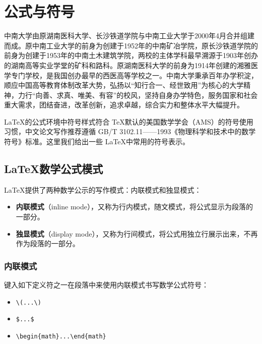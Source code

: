 \chapter{公式与符号}

中南大学由原湖南医科大学、长沙铁道学院与中南工业大学于2000年4月合并组建而成。原中南工业大学的前身为创建于1952年的中南矿冶学院，原长沙铁道学院的前身为创建于1953年的中南土木建筑学院，两校的主体学科最早溯源于1903年创办的湖南高等实业学堂的矿科和路科。原湖南医科大学的前身为1914年创建的湘雅医学专门学校，是我国创办最早的西医高等学校之一。中南大学秉承百年办学积淀，顺应中国高等教育体制改革大势，弘扬以“知行合一、经世致用”为核心的大学精神，力行“向善、求真、唯美、有容”的校风，坚持自身办学特色，服务国家和社会重大需求，团结奋进，改革创新，追求卓越，综合实力和整体水平大幅提升。

\LaTeX 的公式环境中符号样式符合 \TeX 默认的美国数学学会（AMS）的符号使用习惯，中文论文写作推荐遵循 GB/T 3102.11——1993《物理科学和技术中的数学符号》标准。这里我们给出一些 \LaTeX 中常用的符号表示。


\section{\LaTeX 数学公式模式}

\LaTeX 提供了两种数学公示的写作模式：内联模式和独显模式：

\begin{itemize}
    \item \textbf{内联模式}（inline mode），又称为行内模式，随文模式，将公式显示为段落的一部分。
    \item \textbf{独显模式}（display mode），又称为行间模式，将公式用独立行展示出来，不再作为段落的一部分。
\end{itemize}

\subsection{内联模式}


键入如下定义符之一在段落中来使用内联模式书写数学公式符号：

\begin{itemize}
    \item \verb|\(...\)|
    \item \verb|$...$|
    \item \verb|\begin{math}...\end{math}|
\end{itemize}

